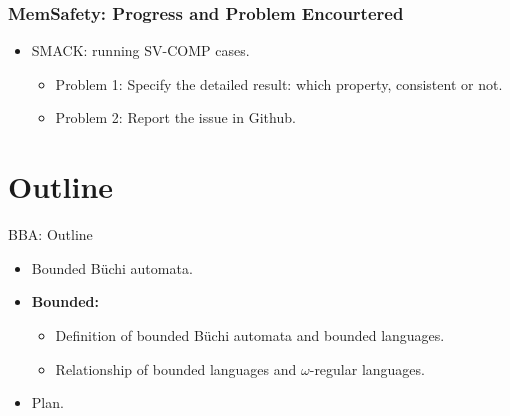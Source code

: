 \documentclass[aspectratio=1610]{beamer}
\newcommand{\buchi}{B\"uchi }
\begin{document}
\begin{frame}\frametitle{MemSafety: Progress and Problem Encourtered}
\begin{itemize}
\item SMACK: running SV-COMP cases.
\begin{itemize}
\item Problem 1: Specify the detailed result: which property, consistent or not.

\item Problem 2: Report the issue in Github.
\end{itemize}
\end{itemize}
\end{frame}

\section{Outline}
\begin{frame}{BBA: Outline}
    \begin{itemize}
        \item  Bounded \buchi automata.
        \item \textbf{Bounded: }
        \begin{itemize}
        
        \item Definition of bounded \buchi automata and bounded languages.
   		 \item Relationship of bounded languages and $\omega$-regular languages. 
        \end{itemize}
        \item Plan.
    \end{itemize}
    
\end{frame}
\end{document}

